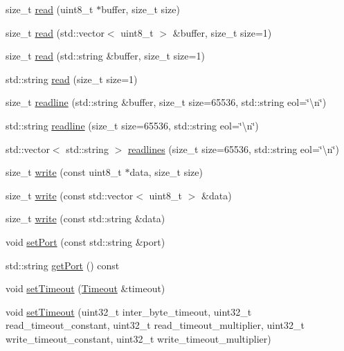 \begin{DoxyCompactItemize}
\item 
size\+\_\+t \hyperlink{classserial_1_1_serial_a01fc2e3d77cb7d70069de87eca1400e9}{read} (uint8\+\_\+t $\ast$buffer, size\+\_\+t size)
\item 
size\+\_\+t \hyperlink{classserial_1_1_serial_a3ecd4645c76548ba079eab6f2f46adfb}{read} (std\+::vector$<$ uint8\+\_\+t $>$ \&buffer, size\+\_\+t size=1)
\item 
size\+\_\+t \hyperlink{classserial_1_1_serial_ad6c6637fdf8edd85c3a6a63d98fc18f7}{read} (std\+::string \&buffer, size\+\_\+t size=1)
\item 
std\+::string \hyperlink{classserial_1_1_serial_aa52fbf7d23fb761a46e2400829d2b77a}{read} (size\+\_\+t size=1)
\item 
size\+\_\+t \hyperlink{classserial_1_1_serial_a010b18ec545dfe1a7bb1c95be4bdaa54}{readline} (std\+::string \&buffer, size\+\_\+t size=65536, std\+::string eol=\char`\"{}\textbackslash{}n\char`\"{})
\item 
std\+::string \hyperlink{classserial_1_1_serial_a04177f637cc02f92ec0492d377528b2a}{readline} (size\+\_\+t size=65536, std\+::string eol=\char`\"{}\textbackslash{}n\char`\"{})
\item 
std\+::vector$<$ std\+::string $>$ \hyperlink{classserial_1_1_serial_a2ff222081c30ee4343498c6cc5c14b10}{readlines} (size\+\_\+t size=65536, std\+::string eol=\char`\"{}\textbackslash{}n\char`\"{})
\item 
size\+\_\+t \hyperlink{classserial_1_1_serial_a3275e8456850998c0ac46b2768ab9258}{write} (const uint8\+\_\+t $\ast$data, size\+\_\+t size)
\item 
size\+\_\+t \hyperlink{classserial_1_1_serial_a9c2827088d82ee82f245ffa106fa7d10}{write} (const std\+::vector$<$ uint8\+\_\+t $>$ \&data)
\item 
size\+\_\+t \hyperlink{classserial_1_1_serial_a7c92c0307b86a935f6623953eec66460}{write} (const std\+::string \&data)
\item 
void \hyperlink{classserial_1_1_serial_a127104a1b211c46e4cad9002123e6ea8}{set\+Port} (const std\+::string \&port)
\item 
std\+::string \hyperlink{classserial_1_1_serial_a56eafe1694c92655d79993ce7139f0bf}{get\+Port} () const 
\item 
void \hyperlink{classserial_1_1_serial_a5b1a4e05b1690d29ba1ae14a9079434c}{set\+Timeout} (\hyperlink{structserial_1_1_timeout}{Timeout} \&timeout)
\item 
void \hyperlink{classserial_1_1_serial_a4b4be39af3e1c68bc6ac09cb55788c86}{set\+Timeout} (uint32\+\_\+t inter\+\_\+byte\+\_\+timeout, uint32\+\_\+t read\+\_\+timeout\+\_\+constant, uint32\+\_\+t read\+\_\+timeout\+\_\+multiplier, uint32\+\_\+t write\+\_\+timeout\+\_\+constant, uint32\+\_\+t write\+\_\+timeout\+\_\+multiplier)

\end{DoxyCompactItemize}
